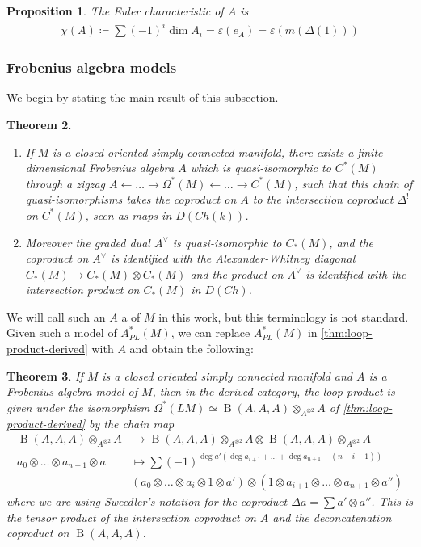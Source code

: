 \documentclass{scrartcl}
\let\emph\relax
\theoremstyle{plain}
\newtheorem{theorem}{Theorem}[section]
\newtheorem{proposition}[theorem]{Proposition}
\theoremstyle{definition}
\renewcommand{\epsilon}{\varepsilon}
\newcommand{\APL}{A_{PL}}
\newcommand{\quiso}{\simeq}
\newcommand{\defeq}{\coloneqq}
\newcommand{\from}{\leftarrow}
\DeclareMathOperator{\BC}{B}
\begin{document}
\begin{proposition}
    The Euler characteristic of $A$ is
    \begin{align*}
        \chi(A) \defeq \sum (-1)^i\dim A_i = \epsilon(e_A) = \epsilon(m(\Delta(1)))
    \end{align*}
\end{proposition}

\subsubsection{Frobenius algebra models}\label{subsubsec:frobenius-algebra-models}

We begin by stating the main result of this subsection. 
\begin{theorem}\label{thm:frobenius-model}
    \begin{enumerate}
    \item If $M$ is a closed oriented simply connected manifold, there exists a finite dimensional Frobenius algebra $A$ which is quasi-isomorphic to $C^*(M)$ through a zigzag $A\from \dots\to \Omega^*(M)\from\dots\to C^*(M)$, such that this chain of quasi-isomorphisms takes the coproduct on $A$ to the intersection coproduct $\Delta^!$ on $C^*(M)$, seen as maps in $D(Ch(k))$. 
    
    \item Moreover the graded dual $A^\vee$ is quasi-isomorphic to $C_*(M)$, and the coproduct on $A^\vee$ is identified with the Alexander-Whitney diagonal $C_*(M)\to C_*(M)\otimes C_*(M)$ and the product on $A^\vee$ is identified with the intersection product on $C_*(M)$ in $D(Ch)$.
    \end{enumerate}
\end{theorem}

We will call such an $A$ a \emph{Frobenius algebra model} of $M$ in this work, but this terminology is not standard. Given such a model of $\APL^*(M)$, we can replace $\APL^*(M)$ in \cref{thm:loop-product-derived} with $A$ and obtain the following:

\begin{theorem}
    If $M$ is a closed oriented simply connected manifold and $A$ is a Frobenius algebra model of $M$, then in the derived category, the loop product is given under the isomorphism $\Omega^*(LM)\quiso \BC(A, A, A)\otimes_{A^{\otimes 2}} A$ of \cref{thm:loop-product-derived} by the chain map
    \begin{align*}
        \BC(A, A, A)\otimes_{A^{\otimes 2}} A &\to \BC(A, A, A)\otimes_{A^{\otimes 2}} A \otimes \BC(A, A, A)\otimes_{A^{\otimes 2}} A \\
        a_0\otimes\dots \otimes a_{n+1}\otimes a &\mapsto \sum(-1)^{\deg a'(\deg a_{i+1}+\dots+\deg a_{n+1} - (n-i-1))}\\
        \qquad& (a_0 \otimes\dots\otimes a_i \otimes 1 \otimes a')\otimes (1\otimes a_{i+1}\otimes\dots\otimes a_{n+1}\otimes a'')
    \end{align*}
    where we are using Sweedler's notation for the coproduct $\Delta a = \sum a'\otimes a''$. This is the tensor product of the intersection coproduct on $A$ and the deconcatenation coproduct on $\BC(A, A, A)$.
\end{theorem}
\end{document}
